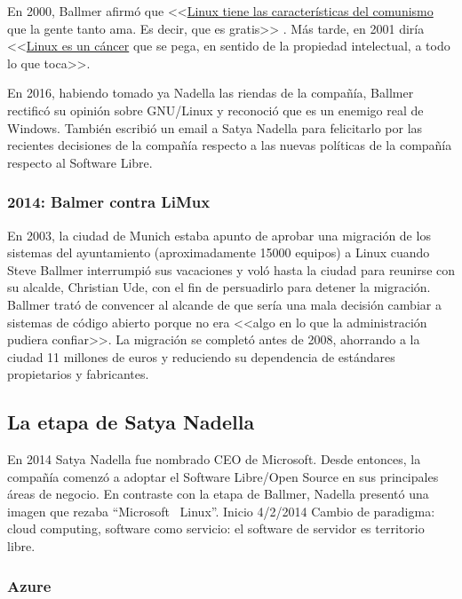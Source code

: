 En 2000, Ballmer afirmó que <<\href{https://www.theregister.co.uk/2000/07/31/ms_ballmer_linux_is_communism/}{Linux tiene las características del comunismo} que la gente tanto ama. Es decir, que es gratis>> \cite{lea_2000:ballmer_linux_comunism}. Más tarde, en 2001 diría <<\href{https://www.theregister.co.uk/2001/06/02/ballmer_linux_is_a_cancer/}{Linux es un cáncer} que se pega, en sentido de la propiedad intelectual, a todo lo que toca>>. \cite{greene_2018:ballmer_linux_cancer}

En 2016, habiendo tomado ya Nadella las riendas de la compañía, Ballmer rectificó su opinión sobre GNU/Linux y reconoció que es un enemigo real de Windows. También escribió un email a Satya Nadella para felicitarlo por las recientes decisiones de la compañía respecto a las nuevas políticas de la compañía respecto al Software Libre.\cite{tung_2016:ballmer_linux_no_more_cancer}

\subsubsection{2014: Balmer contra LiMux}
En 2003, la ciudad de Munich estaba apunto de aprobar una migración de los sistemas del ayuntamiento (aproximadamente 15000 equipos) a Linux cuando Steve Ballmer interrumpió sus vacaciones y voló hasta la ciudad para reunirse con su alcalde, Christian Ude, con el fin de persuadirlo para detener la migración. Ballmer trató de convencer al alcande de que sería una mala decisión cambiar a sistemas de código abierto porque no era <<algo en lo que la administración pudiera confiar>>. La migración se completó antes de 2008, ahorrando a la ciudad 11 millones de euros y reduciendo su dependencia de estándares propietarios y fabricantes.\cite{munich_linux_migration}

\subsection{La etapa de Satya Nadella}
En 2014 Satya Nadella fue nombrado CEO de Microsoft. Desde entonces, la compañía comenzó a adoptar el Software Libre/Open Source en sus principales áreas de negocio. En contraste con la etapa de Ballmer, Nadella presentó una imagen que rezaba ``Microsoft \heart\ Linux''. 
Inicio 4/2/2014
Cambio de paradigma: cloud computing, software como servicio: el software de servidor es territorio libre.

\subsubsection{Azure}

